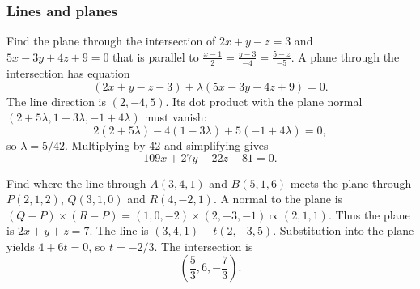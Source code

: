 \subsubsection{Lines and planes}
\begin{enumerate}[label={},leftmargin=0pt,itemsep=9pt]
 Find the plane through the intersection of $2x+y-z=3$ and $5x-3y+4z+9=0$ that is parallel to $\frac{x-1}{2}=\frac{y-3}{-4}=\frac{5-z}{-5}$.
\solution A plane through the intersection has equation
\[
(2x+y-z-3)+\lambda(5x-3y+4z+9)=0.
\]
The line direction is $(2,-4,5)$. Its dot product with the plane normal $(2+5\lambda,1-3\lambda,-1+4\lambda)$ must vanish:
\[
2(2+5\lambda)-4(1-3\lambda)+5(-1+4\lambda)=0,
\]
so $\lambda=5/42$. Multiplying by 42 and simplifying gives
\[
\boxed{109x+27y-22z-81=0}.
\]

 Find where the line through $A(3,4,1)$ and $B(5,1,6)$ meets the plane through $P(2,1,2)$, $Q(3,1,0)$ and $R(4,-2,1)$.
\solution A normal to the plane is $(Q-P)\times(R-P)=(1,0,-2)\times(2,-3,-1)\propto(2,1,1)$. Thus the plane is $2x+y+z=7$. The line is $(3,4,1)+t(2,-3,5)$. Substitution into the plane yields $4+6t=0$, so $t=-2/3$. The intersection is
\[
\boxed{\left(\frac53,6,-\frac73\right)}.
\]
\end{enumerate}

